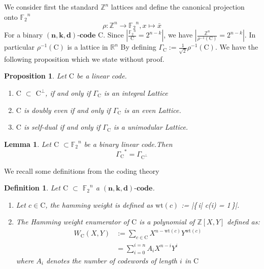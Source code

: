 \documentclass{article}
\newtheorem{lemma}[theorem]{Lemma}
\newtheorem{definition}[theorem]{Definition}
\newtheorem{prop}[theorem]{Proposition}
\numberwithin{equation}{theorem}
\numberwithin{figure}{theorem}
\newcommand{\Ftwo}{\ensuremath{\mathbb{F}_2}}
\newcommand{\simpleCodes}{\ensuremath{\mathrm{C}}}
\newcommand{\buildVertical}[1]{\ensuremath{#1^{\bot}}}
\newcommand{\buildLattice}[1]{\ensuremath{\Gamma_{#1}}}
\newcommand{\weightEnumerator}[3]{\ensuremath{W_{#1}(#2,#3)}}
\newcommand{\linearCode}[3]{\ensuremath{\bm{(#1,#2,#3)\mbox{-}code}}}
\newcommand{\wt}[1]{\ensuremath{\text{wt}(#1)}}
\newcommand{\Integer}{\ensuremath{\mathbb{Z}}}
\newcommand{\Real}{\ensuremath{\mathbb{R}}}
\begin{document}
We consider first the standard $\Integer^{n}$ lattices and define the canonical projection onto $\Ftwo^{n}$
\[
	\rho: \Integer^n \rightarrow \Ftwo^{n}, x \mapsto \bar{x}
\]
For a binary {\linearCode{n}{k}{d}} {\simpleCodes}. Since $|\frac{\Ftwo^n}{\simpleCodes} = 2^{n-k}|$, we have $|\frac{\Integer^{n}}{\rho^{-1}(\simpleCodes)} = 2^{n-k}|$. In particular $\rho^{-1}(\simpleCodes)$ is a lattice in $\Real^n$
By defining $\Gamma_{\simpleCodes} := \frac{1}{\sqrt{2}}\rho^{-1}(\simpleCodes)$. We have the following proposition which we state without proof.
\begin{prop}\label{codeLatticeProp} Let {\simpleCodes} be a linear code.
	\begin{enumerate}
		\item {\simpleCodes} $\subset$ {\buildVertical{\simpleCodes}}, if and only if {\buildLattice{\simpleCodes}} is an integral Lattice
		\item {\simpleCodes} is doubly even if and only if {\buildLattice{\simpleCodes}} is an even Lattice.
		\item {\simpleCodes} is self-dual if and only if {\buildLattice{\simpleCodes}} is a unimodular Lattice.
	\end{enumerate}
\end{prop}
\begin{lemma}\label{latticeDualcodeVertLemma}
Let {\simpleCodes} $\subset \Ftwo^n$ be a binary linear code.Then
\[
	\buildLattice{\simpleCodes}^* = \buildLattice{\buildVertical{\simpleCodes}}
\]
\end{lemma}
We recall some definitions from the coding theory
\begin{definition} Let {\simpleCodes} $\subset$ $\Ftwo^{n}$ a \linearCode{n}{k}{d}. 
	\begin{enumerate}
		\item Let $c \in \simpleCodes$, the hamming weight is defined as \wt{c} := |\{\,i| c(i) = 1\,\}|.
		\item The \emph{Hamming weight enumerator} of {\simpleCodes} is a polynomial of $\Integer[X,Y]$ defined as:
		\begin{align*}
			\weightEnumerator{\simpleCodes}{X}{Y} &:= \sum_{c \in \simpleCodes}X^{n - \wt{c}}Y^{\wt{c}}\\
			&= \sum_{i = 0}^{i = n}A_i X^{n - i}Y^i
		\end{align*}
		where $A_i$ denotes the number of codewords of length $i$ in {\simpleCodes}
	\end{enumerate}
\end{definition}
\end{document}
